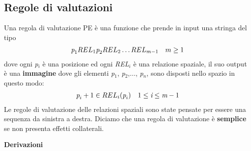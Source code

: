 \subsection{Regole di valutazioni}
Una regola di valutazione PE \cite{pubblicazione: tomita} è una funzione che prende in input una stringa del tipo 
\begin{align}
	\textit{p}_1 REL_1 \textit{p}_2 REL_2 \dots REL_{m-1} \quad    m \ge 1 \notag
\end{align}
dove ogni \textit{p}$_i$ è una posizione ed ogni \textit{REL}$_i$ è una relazione spaziale, il suo output è una \textbf{immagine} dove gli elementi \textit{p}$_1$, \textit{p}$_2$,$\dots$, \textit{p}$_n$, sono disposti nello spazio in questo modo:
\begin{align}
	\textit{p}_i+1 \in REL_i (\textit{p}_i)  \quad    1\le \textit{i} \le \textit{m}-1 \notag
\end{align}
Le regole di valutazione delle relazioni spaziali sono state pensate per essere una sequenza da sinistra a destra. Diciamo che una regola di valutazione è \textbf{semplice} se non presenta effetti collaterali.\par
\vspace{0.5cm}
\noindent \textbf{Derivazioni}\\
